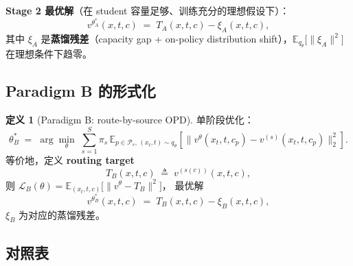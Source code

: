\documentclass[11pt,a4paper]{article}
\newcommand{\loss}{\mathcal{L}}
\newcommand{\E}{\mathbb{E}}
\theoremstyle{definition}
\newtheorem{definition}{定义}
\begin{document}
\textbf{Stage 2 最优解}（在 student 容量足够、训练充分的理想假设下）：
\begin{equation}
v^{\theta_A^*}(x, t, c) \;=\; T_A(x, t, c) - \xi_A(x, t, c),
\label{eq:theta_A_opt}
\end{equation}
其中 $\xi_A$ 是\textbf{蒸馏残差}（capacity gap + on-policy distribution
shift），$\E_{q_\theta}\!\big[\|\xi_A\|^2\big]$ 在理想条件下趋零。

\subsection{Paradigm B 的形式化}

\begin{definition}[Paradigm B: route-by-source OPD]
\label{def:paradigm_B}
单阶段优化：
\begin{equation}
\theta_B^* \;=\; \arg\min_\theta\;\sum_{s=1}^S \pi_s\,\E_{p \in \mathcal{P}_s,\,(x_t, t) \sim q_\theta}\!\left[\big\|v^\theta(x_t, t, c_p) - v^{(s)}(x_t, t, c_p)\big\|_2^2\right].
\label{eq:paradigm_B_obj}
\end{equation}
等价地，定义 \textbf{routing target}
\begin{equation}
T_B(x, t, c) \;\triangleq\; v^{(s(c))}(x, t, c),
\label{eq:T_B_def}
\end{equation}
则 $\loss_B(\theta) = \E_{(x_t, t, c)}\!\big[\|v^\theta - T_B\|^2\big]$，
最优解
\begin{equation}
v^{\theta_B^*}(x, t, c) \;=\; T_B(x, t, c) - \xi_B(x, t, c),
\label{eq:theta_B_opt}
\end{equation}
$\xi_B$ 为对应的蒸馏残差。
\end{definition}

\subsection{对照表}
\end{document}
